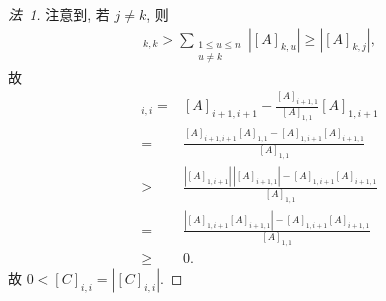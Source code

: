 \begin{proof}[法~1]
    注意到, 若 \(j \neq k\), 则
    \begin{align*}
        [A]_{k,k} >
        \sum_{\substack{1 \leq u \leq n \\
            u \neq k}} {|[A]_{k,u}|}
        \geq |[A]_{k,j}|,
    \end{align*}
    故
    \begin{align*}
        [C]_{i,i}
        = {}    &
        [A]_{i+1,i+1} - \frac{[A]_{i+1,1}}{[A]_{1,1}} [A]_{1,i+1}
        \\
        = {}    &
        \frac{[A]_{i+1,i+1} [A]_{1,1} - [A]_{1,i+1} [A]_{i+1,1}}
        {[A]_{1,1}}
        \\
        > {}    &
        \frac{|[A]_{1,i+1}|\, |[A]_{i+1,1}| - [A]_{1,i+1} [A]_{i+1,1}}
        {[A]_{1,1}}
        \\
        = {}    &
        \frac{|{[A]_{1,i+1} [A]_{i+1,1}}| - [A]_{1,i+1} [A]_{i+1,1}}
        {[A]_{1,1}}
        \\
        \geq {} &
        0.
    \end{align*}
    故 \(0 < [C]_{i,i} = |[C]_{i,i}|\).


\end{proof}
